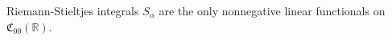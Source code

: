 Riemann-Stieltjes integrals $S_\alpha$ are the only nonnegative linear functionals on $\mathfrak{C}_{00}(\mathbb{R})$.
